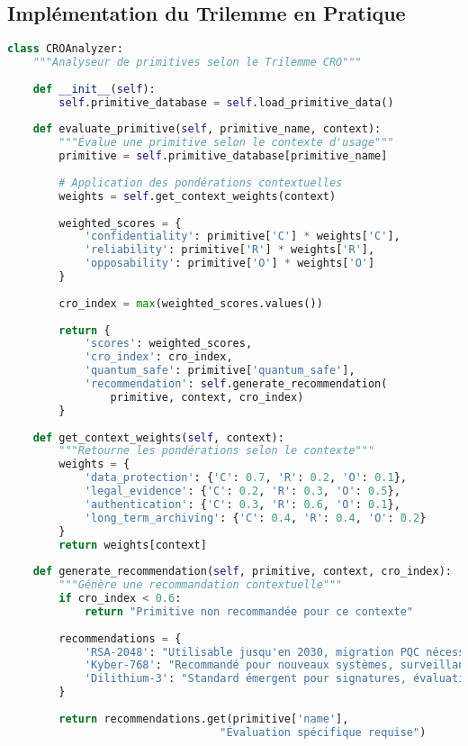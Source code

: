 \subsection{Implémentation du Trilemme en Pratique}
\begin{lstlisting}[language=Python, caption=Implémentation de l'analyse CRO]
class CROAnalyzer:
    """Analyseur de primitives selon le Trilemme CRO"""
    
    def __init__(self):
        self.primitive_database = self.load_primitive_data()
    
    def evaluate_primitive(self, primitive_name, context):
        """Évalue une primitive selon le contexte d'usage"""
        primitive = self.primitive_database[primitive_name]
        
        # Application des pondérations contextuelles
        weights = self.get_context_weights(context)
        
        weighted_scores = {
            'confidentiality': primitive['C'] * weights['C'],
            'reliability': primitive['R'] * weights['R'],
            'opposability': primitive['O'] * weights['O']
        }
        
        cro_index = max(weighted_scores.values())
        
        return {
            'scores': weighted_scores,
            'cro_index': cro_index,
            'quantum_safe': primitive['quantum_safe'],
            'recommendation': self.generate_recommendation(
                primitive, context, cro_index)
        }
    
    def get_context_weights(self, context):
        """Retourne les pondérations selon le contexte"""
        weights = {
            'data_protection': {'C': 0.7, 'R': 0.2, 'O': 0.1},
            'legal_evidence': {'C': 0.2, 'R': 0.3, 'O': 0.5},
            'authentication': {'C': 0.3, 'R': 0.6, 'O': 0.1},
            'long_term_archiving': {'C': 0.4, 'R': 0.4, 'O': 0.2}
        }
        return weights[context]
    
    def generate_recommendation(self, primitive, context, cro_index):
        """Génère une recommandation contextuelle"""
        if cro_index < 0.6:
            return "Primitive non recommandée pour ce contexte"
        
        recommendations = {
            'RSA-2048': "Utilisable jusqu'en 2030, migration PQC nécessaire",
            'Kyber-768': "Recommandé pour nouveaux systèmes, surveillance standardisation",
            'Dilithium-3': "Standard émergent pour signatures, évaluation juridique en cours"
        }
        
        return recommendations.get(primitive['name'], 
                                 "Évaluation spécifique requise")
\end{lstlisting}

